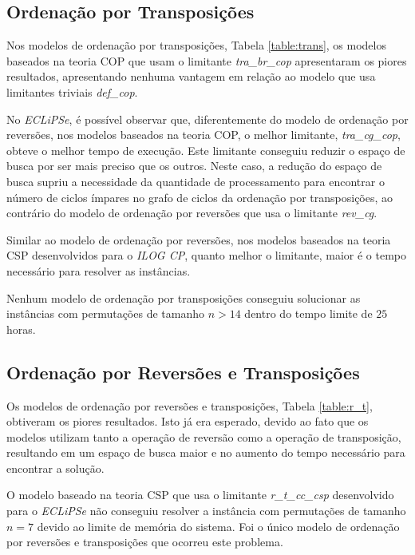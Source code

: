 

\subsection{Ordenação por Transposições}
\label{subsec:analise_tra}
Nos modelos de ordenação por transposições, Tabela \ref{table:trans},
os modelos baseados na teoria COP que usam o
limitante \textit{tra\_br\_cop} apresentaram os piores resultados,
apresentando nenhuma vantagem em relação ao modelo que usa limitantes
triviais \textit{def\_cop}.

No \textit{ECLiPSe}, é possível observar que, diferentemente do modelo
de ordenação por reversões, nos modelos baseados na teoria COP, o
melhor limitante, \textit{tra\_cg\_cop}, obteve o melhor tempo de
execução. Este limitante conseguiu reduzir o espaço de busca por ser
mais preciso que os outros. Neste caso, a redução do espaço de busca
supriu a necessidade da quantidade de processamento para encontrar o
número de ciclos ímpares no grafo de ciclos da ordenação por
transposições, ao contrário do modelo de ordenação por reversões que
usa o limitante \textit{rev\_cg}.

Similar ao modelo de ordenação por reversões, nos modelos baseados na
teoria CSP desenvolvidos para o \textit{ILOG CP}, quanto melhor o
limitante, maior é o tempo necessário para resolver as instâncias.

Nenhum modelo de ordenação por transposições conseguiu solucionar as
instâncias com permutações de tamanho $n > 14$ dentro do tempo limite
de $25$ horas.



\subsection{Ordenação por Reversões e Transposições}
\label{subsec:analise_r_t}
Os modelos de ordenação por reversões e transposições,
Tabela \ref{table:r_t}, obtiveram os piores resultados. Isto já era
esperado, devido ao fato que os modelos utilizam tanto a operação de
reversão como a operação de transposição, resultando em um espaço de
busca maior e no aumento do tempo necessário para encontrar a solução.

O modelo baseado na teoria CSP que usa o
limitante \textit{r\_t\_cc\_csp} desenvolvido para o \textit{ECLiPSe}
não conseguiu resolver a instância com permutações de tamanho $n = 7$
devido ao limite de memória do sistema. Foi o único modelo de
ordenação por reversões e transposições que ocorreu este problema.

